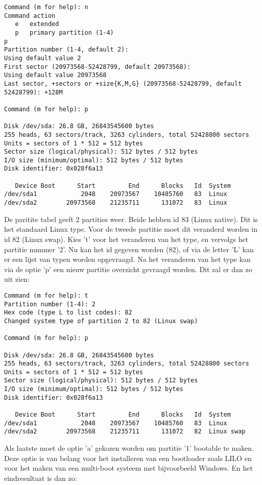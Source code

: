 \begin{lstlisting}
Command (m for help): n
Command action
   e   extended
   p   primary partition (1-4)
p
Partition number (1-4, default 2): 
Using default value 2
First sector (20973568-52428799, default 20973568): 
Using default value 20973568
Last sector, +sectors or +size{K,M,G} (20973568-52428799, default 52428799): +128M

Command (m for help): p

Disk /dev/sda: 26.8 GB, 26843545600 bytes
255 heads, 63 sectors/track, 3263 cylinders, total 52428800 sectors
Units = sectors of 1 * 512 = 512 bytes
Sector size (logical/physical): 512 bytes / 512 bytes
I/O size (minimum/optimal): 512 bytes / 512 bytes
Disk identifier: 0x028f6a13

   Device Boot      Start         End      Blocks   Id  System
/dev/sda1            2048    20973567    10485760   83  Linux
/dev/sda2        20973568    21235711      131072   83  Linux
\end{lstlisting}
De paritite tabel geeft 2 partities weer. Beide hebben id 83 (Linux native). Dit is het standaard Linux type. Voor de tweede partitie moet dit veranderd worden in id 82 (Linux swap).
Kies 't' voor het veranderen van het type, en vervolgs het partitie nummer '2'. Nu kan het id gegeven worden (82), of via de letter 'L' kan er een lijst van typen worden opgevraagd. Na het veranderen van het type kan via de optie 'p' een nieuw partitie overzicht gevraagd worden. Dit zal er dan zo uit zien:
\begin{lstlisting}
Command (m for help): t
Partition number (1-4): 2
Hex code (type L to list codes): 82
Changed system type of partition 2 to 82 (Linux swap)

Command (m for help): p

Disk /dev/sda: 26.8 GB, 26843545600 bytes
255 heads, 63 sectors/track, 3263 cylinders, total 52428800 sectors
Units = sectors of 1 * 512 = 512 bytes
Sector size (logical/physical): 512 bytes / 512 bytes
I/O size (minimum/optimal): 512 bytes / 512 bytes
Disk identifier: 0x028f6a13

   Device Boot      Start         End      Blocks   Id  System
/dev/sda1            2048    20973567    10485760   83  Linux
/dev/sda2        20973568    21235711      131072   82  Linux swap
\end{lstlisting}
Als laatste moet de optie 'a' gekozen worden om partitie '1' bootable te maken. Deze optie is van belang voor het installeren van een bootloader zoals LILO en voor het maken van een multi-boot systeem met bijvoorbeeld Windows. En het eindresultaat is dan zo:

